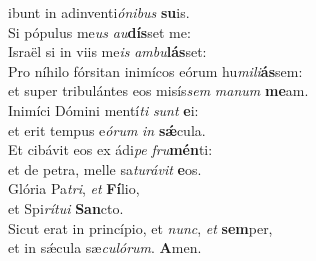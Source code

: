 \oddverse ibunt in adinventi\textit{ó}\textit{ni}\textit{bus} \textbf{su}is.\\
\evenverse Si pópulus me\textit{us} \textit{au}\textbf{dís}set me:~\*\\
\evenverse Israël si in viis me\textit{is} \textit{am}\textit{bu}\textbf{lás}set:\\
\oddverse Pro níhilo fórsitan inimícos eórum hu\textit{mi}\textit{li}\textbf{ás}sem:~\*\\
\oddverse et super tribulántes eos misís\textit{sem} \textit{ma}\textit{num} \textbf{me}am.\\
\evenverse Inimíci Dómini mentí\textit{ti} \textit{sunt} \textbf{e}i:~\*\\
\evenverse et erit tempus e\textit{ó}\textit{rum} \textit{in} \textbf{sǽ}cula.\\
\oddverse Et cibávit eos ex ádi\textit{pe} \textit{fru}\textbf{mén}ti:~\*\\
\oddverse et de petra, melle sa\textit{tu}\textit{rá}\textit{vit} \textbf{e}os.\\
\evenverse Glória Pa\textit{tri}, \textit{et} \textbf{Fí}lio,~\*\\
\evenverse et Spi\textit{rí}\textit{tu}\textit{i} \textbf{San}cto.\\
\oddverse Sicut erat in princípio, et \textit{nunc}, \textit{et} \textbf{sem}per,~\*\\
\oddverse et in sǽcula sæ\textit{cu}\textit{ló}\textit{rum}. \textbf{A}men.\\

